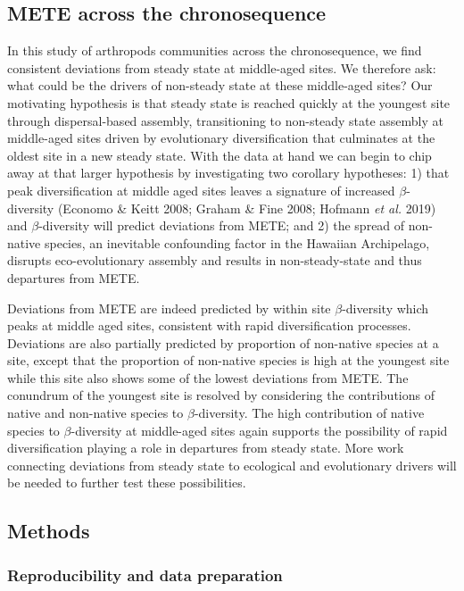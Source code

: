 \documentclass[
  letterpaper,
  DIV=11,
  numbers=noendperiod]{scrartcl}
\begin{document}
\subsection{METE across the
chronosequence}\label{mete-across-the-chronosequence}

In this study of arthropods communities across the chronosequence, we
find consistent deviations from steady state at middle-aged sites. We
therefore ask: what could be the drivers of non-steady state at these
middle-aged sites? Our motivating hypothesis is that steady state is
reached quickly at the youngest site through dispersal-based assembly,
transitioning to non-steady state assembly at middle-aged sites driven
by evolutionary diversification that culminates at the oldest site in a
new steady state. With the data at hand we can begin to chip away at
that larger hypothesis by investigating two corollary hypotheses: 1)
that peak diversification at middle aged sites leaves a signature of
increased \(\beta\)-diversity (Economo \& Keitt 2008; Graham \& Fine
2008; Hofmann \emph{et al.} 2019) and \(\beta\)-diversity will predict
deviations from METE; and 2) the spread of non-native species, an
inevitable confounding factor in the Hawaiian Archipelago, disrupts
eco-evolutionary assembly and results in non-steady-state and thus
departures from METE.

Deviations from METE are indeed predicted by within site
\(\beta\)-diversity which peaks at middle aged sites, consistent with
rapid diversification processes. Deviations are also partially predicted
by proportion of non-native species at a site, except that the
proportion of non-native species is high at the youngest site while this
site also shows some of the lowest deviations from METE. The conundrum
of the youngest site is resolved by considering the contributions of
native and non-native species to \(\beta\)-diversity. The high
contribution of native species to \(\beta\)-diversity at middle-aged
sites again supports the possibility of rapid diversification playing a
role in departures from steady state. More work connecting deviations
from steady state to ecological and evolutionary drivers will be needed
to further test these possibilities.

\subsection{Methods}\label{methods}

\subsubsection{Reproducibility and data
preparation}\label{reproducibility-and-data-preparation}
\end{document}
